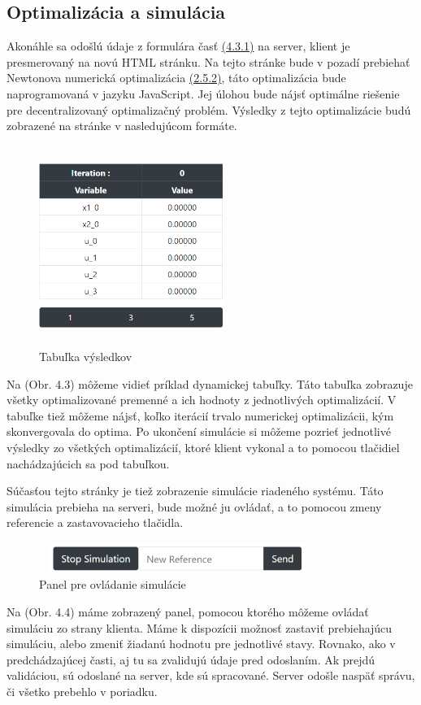 \subsection{Optimalizácia a simulácia}
\label{subse:OPTaSIM}
Akonáhle sa odošlú údaje z formulára časť \hyperref[subse:Formular]{(4.3.1)} na server, klient je presmerovaný na novú HTML stránku. Na tejto stránke bude v pozadí prebiehať Newtonova numerická optimalizácia  \hyperref[opt:Newton]{(2.5.2)}, táto optimalizácia bude naprogramovaná v jazyku JavaScript. Jej úlohou bude nájsť optimálne riešenie pre decentralizovaný optimalizačný problém. Výsledky z tejto optimalizácie budú zobrazené na stránke v nasledujúcom formáte. 
\label{fig:Tabulka}
\begin{figure}[H]	
	\centering
	\includegraphics[width=6cm,height=6.5cm]{images/tabulka}
	\caption{Tabuľka výsledkov}
\end{figure}
Na (Obr. 4.3) môžeme vidieť príklad dynamickej tabuľky. Táto tabuľka zobrazuje všetky optimalizované premenné a ich hodnoty z jednotlivých optimalizácií. V tabuľke tiež môžeme nájsť, koľko iterácií trvalo numerickej optimalizácii, kým skonvergovala do optima. Po ukončení simulácie si môžeme pozrieť jednotlivé výsledky zo všetkých optimalizácií, ktoré klient vykonal a to pomocou tlačidiel nachádzajúcich sa pod tabuľkou.

Súčasťou tejto stránky je tiež zobrazenie simulácie riadeného systému. Táto simulácia prebieha na serveri, bude možné ju ovládať, a to pomocou zmeny referencie a zastavovacieho tlačidla.
\begin{figure}[H]	
	\centering
	\includegraphics[width=9cm,height=1cm]{images/ovladanie_simulacie}
	\caption{Panel pre ovládanie simulácie}
\end{figure}
Na (Obr. 4.4) máme zobrazený panel, pomocou ktorého môžeme ovládať simuláciu zo strany klienta. Máme k dispozícii možnosť zastaviť prebiehajúcu simuláciu, alebo zmeniť žiadanú hodnotu pre jednotlivé stavy. Rovnako, ako v predchádzajúcej časti, aj tu sa zvalidujú údaje pred odoslaním. Ak prejdú validáciou, sú odoslané na server, kde sú spracované. Server odošle naspäť správu, či všetko prebehlo v poriadku.

